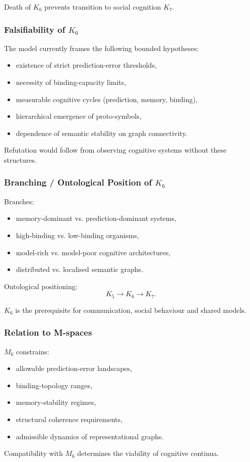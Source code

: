 Death of $K_6$ prevents transition to social cognition $K_7$.

\subsubsection{Falsifiability of \texorpdfstring{$K_6$}{K_6}}

The model currently frames the following bounded hypotheses: \begin{itemize}
    \item existence of strict prediction-error thresholds,
    \item necessity of binding-capacity limits,
    \item measurable cognitive cycles (prediction, memory, binding),
    \item hierarchical emergence of proto-symbols,
    \item dependence of semantic stability on graph connectivity.
\end{itemize}

Refutation would follow from observing cognitive systems without these structures.

\subsubsection{Branching / Ontological Position of \texorpdfstring{$K_6$}{K_6}}

Branches:
\begin{itemize}
    \item memory-dominant vs. prediction-dominant systems,
    \item high-binding vs. low-binding organisms,
    \item model-rich vs. model-poor cognitive architectures,
    \item distributed vs. localised semantic graphs.
\end{itemize}

Ontological positioning:
\[
K_5 \to K_6 \to K_7.
\]

$K_6$ is the prerequisite for communication, social behaviour and shared models.

\subsubsection{Relation to M-spaces}

$M_6$ constrains:
\begin{itemize}
    \item allowable prediction-error landscapes,
    \item binding-topology ranges,
    \item memory-stability regimes,
    \item structural coherence requirements,
    \item admissible dynamics of representational graphs.
\end{itemize}

Compatibility with $M_6$ determines the viability of cognitive continua.
